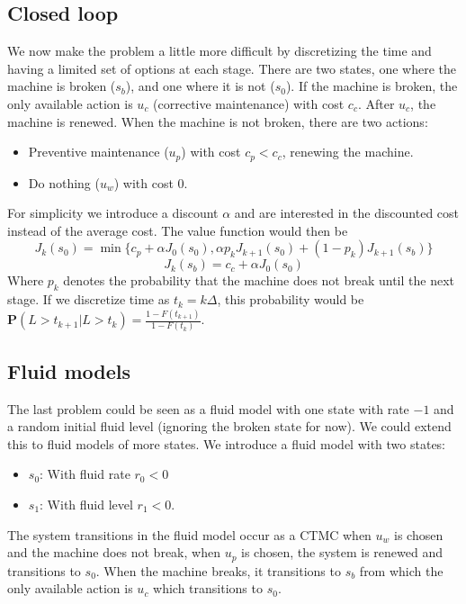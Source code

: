 \subsection{Closed loop}
We now make the problem a little more difficult by discretizing the time and having a limited set of options at each stage.
There are two states, one where the machine is broken ($s_b$), and one where it is not ($s_0$). If the machine is broken, the only available action is $u_c$ (corrective maintenance) with cost $c_c$. After $u_c$, the machine is renewed. When the machine is not broken, there are two actions:
\begin{itemize}
\item Preventive maintenance ($u_p$) with cost $c_p<c_c$, renewing the machine.
\item Do nothing ($u_w$) with cost 0.
\end{itemize}
For simplicity we introduce a discount $\alpha$ and are interested in the discounted cost instead of the average cost. The value function would then be 
$$
J_{k}(s_0)=\min\{c_p+\alpha J_0(s_0),\alpha p_kJ_{k+1}(s_0)+(1-p_k)J_{k+1}(s_b)\}
$$
$$
J_{k}(s_b)=c_c+\alpha J_0(s_0)
$$
Where $p_k$ denotes the probability that the machine does not break until the next stage. If we discretize time as $t_k=k\Delta$, this probability would be $\mathbf{P}(L>t_{k+1}|L>t_k)=\frac{1-F(t_{k+1})}{1-F(t_k)}$.

\subsection{Fluid models}
The last problem could be seen as a fluid model with one state with rate $-1$ and a random initial fluid level (ignoring the broken state for now). We could extend this to fluid models of more states.
We introduce a fluid model with two states: 
\begin{itemize}
\item $s_0$: With fluid rate $r_0<0$
\item $s_1$: With fluid level $r_1<0$.
\end{itemize}
The system transitions in the fluid model occur as a CTMC when $u_w$ is chosen and the machine does not break, when $u_p$ is chosen, the system is renewed and transitions to $s_0$. When the machine breaks, it transitions to $s_b$ from which the only available action is $u_c$ which transitions to $s_0$.\\

